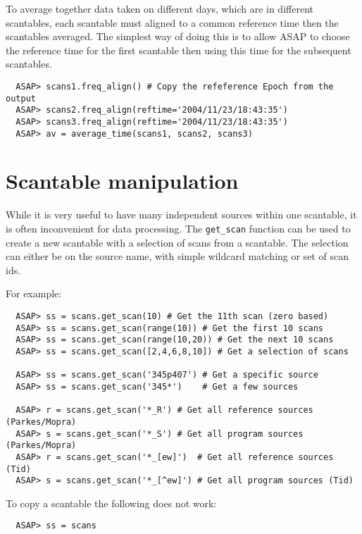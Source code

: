 \documentclass[11pt]{article}
\newcommand{\cmd}[1]{{\tt #1}}
\begin{document}
To average together data taken on different days, which are in
different scantables, each scantable must aligned to a common
reference time then the scantables averaged. The simplest way of
doing this is to allow ASAP to choose the reference time for the first
scantable then using this time for the subsequent scantables. 

\begin{verbatim}
  ASAP> scans1.freq_align() # Copy the refeference Epoch from the output
  ASAP> scans2.freq_align(reftime='2004/11/23/18:43:35')
  ASAP> scans3.freq_align(reftime='2004/11/23/18:43:35')
  ASAP> av = average_time(scans1, scans2, scans3)
\end{verbatim}

\section{Scantable manipulation}

While it is very useful to have many independent sources within one
scantable, it is often inconvenient for data processing. The
\cmd{get\_scan} function can be used to create a new scantable with a
selection of scans from a scantable. The selection can either be on
the source name, with simple wildcard matching or set of scan ids.

For example:

\begin{verbatim}
  ASAP> ss = scans.get_scan(10) # Get the 11th scan (zero based)
  ASAP> ss = scans.get_scan(range(10)) # Get the first 10 scans
  ASAP> ss = scans.get_scan(range(10,20)) # Get the next 10 scans
  ASAP> ss = scans.get_scan([2,4,6,8,10]) # Get a selection of scans

  ASAP> ss = scans.get_scan('345p407') # Get a specific source
  ASAP> ss = scans.get_scan('345*')    # Get a few sources

  ASAP> r = scans.get_scan('*_R') # Get all reference sources (Parkes/Mopra)
  ASAP> s = scans.get_scan('*_S') # Get all program sources (Parkes/Mopra)
  ASAP> r = scans.get_scan('*_[ew]')  # Get all reference sources (Tid)
  ASAP> s = scans.get_scan('*_[^ew]') # Get all program sources (Tid)

\end{verbatim}

To copy a scantable the following does not work:

\begin{verbatim}
  ASAP> ss = scans
\end{verbatim}
\end{document}
